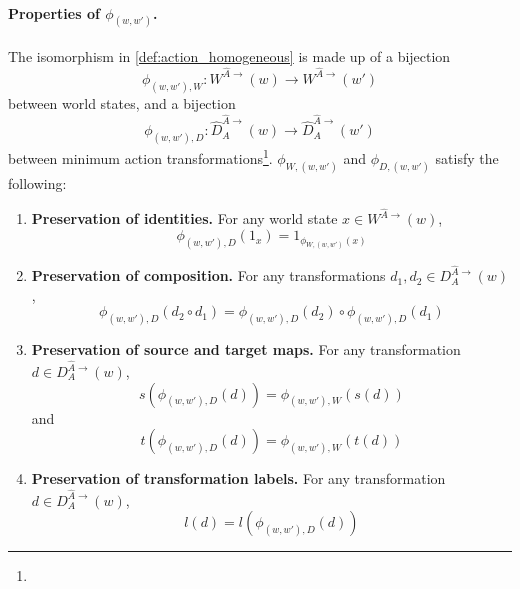 \paragraph{Properties of $\phi_{(w,w')}$.}
The isomorphism in \cref{def:action_homogeneous} is made up of a bijection
\begin{equation}
    \phi_{(w,w'), W}: W^{\hat{A}\to}(w) \to W^{\hat{A}\to}(w')
\end{equation}
between world states, and a bijection
\begin{equation}
    \phi_{(w,w'), D}: \hat{D}_{A}^{\hat{A}\to}(w) \to \hat{D}_{A}^{\hat{A}\to}(w')
\end{equation}
between minimum action transformations\footnote{}.
$\phi_{W,(w,w')}$ and $\phi_{D,(w,w')}$ satisfy the following:
\begin{enumerate}
    \item \textbf{Preservation of identities.}
    For any world state $x \in W^{\hat{A}\to}(w)$,
    \begin{equation}
        \phi_{(w,w'), D}(1_{x}) = 1_{\phi_{W,(w,w')}(x)}
    \end{equation}

    \item \textbf{Preservation of composition.}
    For any transformations $d_{1}, d_{2} \in D_{A}^{\hat{A}\to}(w)$,
    \begin{equation}
        \phi_{(w,w'), D}(d_{2} \circ d_{1}) = \phi_{(w,w'), D}(d_{2}) \circ \phi_{(w,w'), D}(d_{1})
    \end{equation}

    \item \textbf{Preservation of source and target maps.}
    For any transformation $d \in D_{A}^{\hat{A}\to}(w)$,
    \begin{equation}
        s(\phi_{(w,w'), D}(d)) = \phi_{(w,w'), W}(s(d))
    \end{equation}
    and
    \begin{equation}
        t(\phi_{(w,w'), D}(d)) = \phi_{(w,w'), W}(t(d))
    \end{equation}

    \item \textbf{Preservation of transformation labels.}
    For any transformation $d \in D_{A}^{\hat{A}\to}(w)$,
    \begin{equation}
        l(d) = l(\phi_{(w,w'), D}(d))
    \end{equation}
\end{enumerate}

